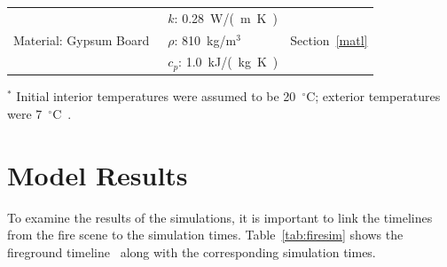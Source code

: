 \documentclass[12pt,oneside]{book}
\begin{document}
\begin{table}
\begin{tabular}{lll}
\multirow{3}{*}{Material: Gypsum Board~\cite{WAKILI2007}}  &  $k$: 0.28~\si{W/(m.K)}                       &  \multirow{3}{*}{Section~\ref{matl}}  \\ 
                                                           &  $\rho$: 810~kg/m$^3$                         &                                       \\ 
                                                           &  $c_{p}$: 1.0~\si{kJ/(kg.K)}                  &                                       \\
\bottomrule[1.25pt]
\end{tabular}\par
\footnotesize
$^{*}$ Initial interior temperatures were assumed to be 20~$^{\circ}$C; exterior temperatures were 7~$^{\circ}$C~\cite{NIOSH:Bowyer}.
\normalsize
\end{table}

\chapter{Model Results}
\label{results}

To examine the results of the simulations, it is important to link the timelines from the fire scene to the simulation times. Table~\ref{tab:firesim} shows the fireground timeline~\cite{NIOSH:Bowyer} along with the corresponding simulation times.
\end{document}
